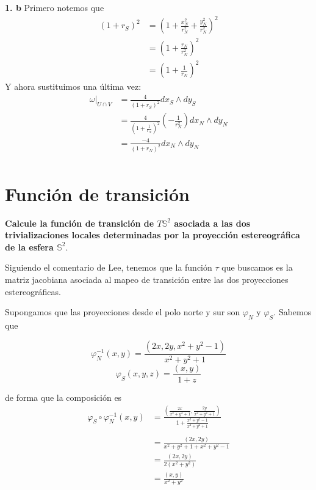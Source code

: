 \documentclass[11pt]{article}
\begin{document}
\textbf{1. b}
Primero notemos que
\begin{equation*}
    \begin{split}
        (1+r_S)^2&=\left(1+\frac{x_N^2}{r_N^2}+\frac{y^2_N}{r^2_N}\right)^2\\
        &=\left(1+\frac{r_N}{r_N^2}\right)^2\\
        &=\left(1+\frac{1}{r_N}\right)^2
    \end{split}
\end{equation*}
Y ahora sustituimos una última vez:
\begin{equation*}
    \begin{split}
        \omega|_{U\cap V}&=\frac{4}{(1+r_S)^2}dx_S\wedge dy_S\\
        &=\frac{4}{\left(1+\frac{1}{r_N}\right)^2}\left(-\frac{1}{r_N^2}\right)dx_N\wedge dy_N\\
        &=\frac{-4}{(1+r_N)^2}dx_N\wedge dy_N\\
    \end{split}
\end{equation*}

\newpage
\section{Función de transición}
\textbf{Calcule la función de transición de $T\mathbb{S}^2$ asociada a las dos trivializaciones locales determinadas por la proyección estereográfica de la esfera $\mathbb{S}^2$}.\par
Siguiendo el comentario de Lee, tenemos que la función $\tau$ que buscamos es la matriz jacobiana asociada al mapeo de transición entre las dos proyecciones estereográficas.\par
Supongamos que las proyecciones desde el polo norte y sur son $\varphi_N$ y $\varphi_S$. Sabemos que

$$\varphi_N^{-1}(x,y)=\frac{(2x,2y,x^2+y^2-1)}{x^2+y^2+1}$$
$$\varphi_S(x,y,z)=\frac{(x,y)}{1+z}$$

de forma que la composición es
\begin{align*}    \varphi_S\circ\varphi_N^{-1}(x,y)&=\frac{(\frac{2x}{x^2+y^2+1},\frac{2y}{x^2+y^2+1})}{1+\frac{x^2+y^2-1}{x^2+y^2+1}}\\ \\
&=\frac{(2x,2y)}{x^2+y^2+1+x^2+y^2-1}\\
&=\frac{(2x,2y)}{2(x^2+y^2)}\\
&=\frac{(x,y)}{x^2+y^2}
\end{align*}
\end{document}
